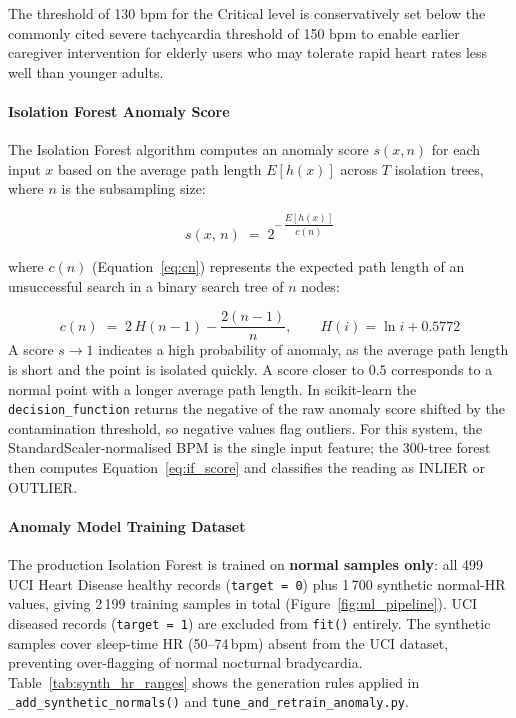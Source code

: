 The threshold of 130 bpm for the Critical level is conservatively set below the commonly cited severe tachycardia threshold of 150 bpm to enable earlier caregiver intervention for elderly users who may tolerate rapid heart rates less well than younger adults.

\paragraph{Isolation Forest Anomaly Score}
\label{subsec:if_score}

The Isolation Forest algorithm computes an anomaly score $s(x,n)$ for each input $x$ based on the average path length $E[h(x)]$ across $T$ isolation trees, where $n$ is the subsampling size:

\begin{equation}
s(x,\,n) \;=\; 2^{-\,\dfrac{E[h(x)]}{c(n)}}
\label{eq:if_score}
\end{equation}

\noindent where $c(n)$ (Equation~\eqref{eq:cn}) represents the expected path length of an unsuccessful search in a binary search tree of $n$ nodes:

\begin{equation}
c(n) \;=\; 2\,H(n-1) - \dfrac{2(n-1)}{n},
\qquad H(i) = \ln i + 0.5772
\label{eq:cn}
\end{equation}
A score $s \to 1$ indicates a high probability of anomaly, as the average path length is short and the point is isolated quickly. A score closer to $0.5$ corresponds to a normal point with a longer average path length. In scikit-learn the
\texttt{decision\_function} returns the negative of the raw anomaly score
shifted by the contamination threshold, so negative values flag outliers.
For this system, the StandardScaler-normalised BPM is the single input
feature; the 300-tree forest then computes Equation~\eqref{eq:if_score}
and classifies the reading as INLIER or OUTLIER.

\paragraph{Anomaly Model Training Dataset}
\label{subsec:synth_data}

The production Isolation Forest is trained on \textbf{normal samples only}: all 499 UCI Heart Disease healthy records (\texttt{target\,=\,0}) plus 1\,700 synthetic normal-HR values, giving 2\,199 training samples in total (Figure~\ref{fig:ml_pipeline}).
UCI diseased records (\texttt{target\,=\,1}) are excluded from \texttt{fit()} entirely.
The synthetic samples cover sleep-time HR (50--74\,bpm) absent from the UCI dataset,
preventing over-flagging of normal nocturnal bradycardia.
Table~\ref{tab:synth_hr_ranges} shows the generation rules applied in
\texttt{\_add\_synthetic\_normals()} and \texttt{tune\_and\_retrain\_anomaly.py}.

